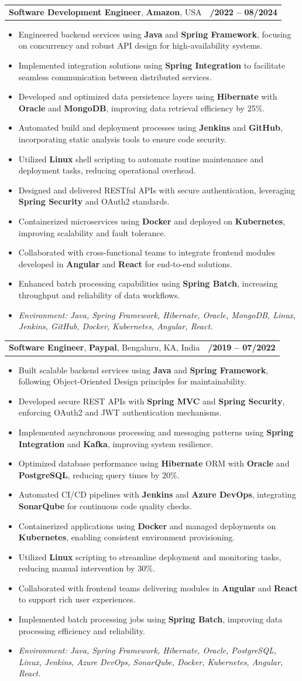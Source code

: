 \documentclass[letterpaper,11pt]{article}
\makeatletter
\newcommand{\resumeItem}[1]{
  \item\footnotesize{
    {#1 \vspace{-2pt}}
  }
}
\newcommand{\resumeSubheading}[4]{
  \vspace{-2pt}\item
    \begin{tabular*}{1.0\textwidth}[t]{l@{\extracolsep{\fill}}r}
      \textbf{\fontsize{10pt}{14pt}\selectfont #3}, \textbf{\fontsize{10pt}{14pt}\selectfont #1}, \fontsize{10pt}{14pt}\selectfont #4 & \textbf{\fontsize{10pt}{14pt}\selectfont #2} \\
    \end{tabular*}\vspace{-7pt}
}
\newcommand{\resumeItemListStart}{\begin{itemize}[leftmargin=*]}
\newcommand{\resumeItemListEnd}{\end{itemize}\vspace{-5pt}}
\makeatother
\begin{document}
\resumeSubheading
{Amazon}{10/2022 -- 08/2024}
{Software Development Engineer}{USA}
\resumeItemListStart
  \resumeItem{Engineered backend services using \textbf{Java} and \textbf{Spring Framework}, focusing on concurrency and robust API design for high-availability systems.}
  \resumeItem{Implemented integration solutions using \textbf{Spring Integration} to facilitate seamless communication between distributed services.}
  \resumeItem{Developed and optimized data persistence layers using \textbf{Hibernate} with \textbf{Oracle} and \textbf{MongoDB}, improving data retrieval efficiency by 25\%.}
  \resumeItem{Automated build and deployment processes using \textbf{Jenkins} and \textbf{GitHub}, incorporating static analysis tools to ensure code security.}
  \resumeItem{Utilized \textbf{Linux} shell scripting to automate routine maintenance and deployment tasks, reducing operational overhead.}
  \resumeItem{Designed and delivered RESTful APIs with secure authentication, leveraging \textbf{Spring Security} and OAuth2 standards.}
  \resumeItem{Containerized microservices using \textbf{Docker} and deployed on \textbf{Kubernetes}, improving scalability and fault tolerance.}
  \resumeItem{Collaborated with cross-functional teams to integrate frontend modules developed in \textbf{Angular} and \textbf{React} for end-to-end solutions.}
  \resumeItem{Enhanced batch processing capabilities using \textbf{Spring Batch}, increasing throughput and reliability of data workflows.}
  \resumeItem{\textit{Environment: Java, Spring Framework, Hibernate, Oracle, MongoDB, Linux, Jenkins, GitHub, Docker, Kubernetes, Angular, React.}}
\resumeItemListEnd

\resumeSubheading
{Paypal}{08/2019 -- 07/2022}
{Software Engineer}{Bengaluru, KA, India}
\resumeItemListStart
  \resumeItem{Built scalable backend services using \textbf{Java} and \textbf{Spring Framework}, following Object-Oriented Design principles for maintainability.}
  \resumeItem{Developed secure REST APIs with \textbf{Spring MVC} and \textbf{Spring Security}, enforcing OAuth2 and JWT authentication mechanisms.}
  \resumeItem{Implemented asynchronous processing and messaging patterns using \textbf{Spring Integration} and \textbf{Kafka}, improving system resilience.}
  \resumeItem{Optimized database performance using \textbf{Hibernate} ORM with \textbf{Oracle} and \textbf{PostgreSQL}, reducing query times by 20\%.}
  \resumeItem{Automated CI/CD pipelines with \textbf{Jenkins} and \textbf{Azure DevOps}, integrating \textbf{SonarQube} for continuous code quality checks.}
  \resumeItem{Containerized applications using \textbf{Docker} and managed deployments on \textbf{Kubernetes}, enabling consistent environment provisioning.}
  \resumeItem{Utilized \textbf{Linux} scripting to streamline deployment and monitoring tasks, reducing manual intervention by 30\%.}
  \resumeItem{Collaborated with frontend teams delivering modules in \textbf{Angular} and \textbf{React} to support rich user experiences.}
  \resumeItem{Implemented batch processing jobs using \textbf{Spring Batch}, improving data processing efficiency and reliability.}
  \resumeItem{\textit{Environment: Java, Spring Framework, Hibernate, Oracle, PostgreSQL, Linux, Jenkins, Azure DevOps, SonarQube, Docker, Kubernetes, Angular, React.}}
\resumeItemListEnd
\end{document}
